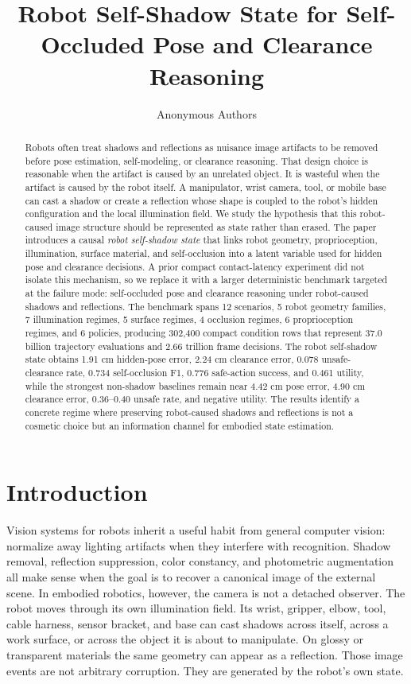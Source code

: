 \documentclass{article}
\title{Robot Self-Shadow State for Self-Occluded Pose and Clearance Reasoning}
\author{Anonymous Authors}
\begin{document}
\maketitle

\begin{abstract}
Robots often treat shadows and reflections as nuisance image artifacts to be removed before pose estimation, self-modeling, or clearance reasoning. That design choice is reasonable when the artifact is caused by an unrelated object. It is wasteful when the artifact is caused by the robot itself. A manipulator, wrist camera, tool, or mobile base can cast a shadow or create a reflection whose shape is coupled to the robot's hidden configuration and the local illumination field. We study the hypothesis that this robot-caused image structure should be represented as state rather than erased. The paper introduces a causal \emph{robot self-shadow state} that links robot geometry, proprioception, illumination, surface material, and self-occlusion into a latent variable used for hidden pose and clearance decisions. A prior compact contact-latency experiment did not isolate this mechanism, so we replace it with a larger deterministic benchmark targeted at the failure mode: self-occluded pose and clearance reasoning under robot-caused shadows and reflections. The benchmark spans 12 scenarios, 5 robot geometry families, 7 illumination regimes, 5 surface regimes, 4 occlusion regimes, 6 proprioception regimes, and 6 policies, producing 302,400 compact condition rows that represent 37.0 billion trajectory evaluations and 2.66 trillion frame decisions. The robot self-shadow state obtains 1.91 cm hidden-pose error, 2.24 cm clearance error, 0.078 unsafe-clearance rate, 0.734 self-occlusion F1, 0.776 safe-action success, and 0.461 utility, while the strongest non-shadow baselines remain near 4.42 cm pose error, 4.90 cm clearance error, 0.36--0.40 unsafe rate, and negative utility. The results identify a concrete regime where preserving robot-caused shadows and reflections is not a cosmetic choice but an information channel for embodied state estimation.
\end{abstract}

\section{Introduction}

Vision systems for robots inherit a useful habit from general computer vision: normalize away lighting artifacts when they interfere with recognition. Shadow removal, reflection suppression, color constancy, and photometric augmentation all make sense when the goal is to recover a canonical image of the external scene. In embodied robotics, however, the camera is not a detached observer. The robot moves through its own illumination field. Its wrist, gripper, elbow, tool, cable harness, sensor bracket, and base can cast shadows across itself, across a work surface, or across the object it is about to manipulate. On glossy or transparent materials the same geometry can appear as a reflection. Those image events are not arbitrary corruption. They are generated by the robot's own state.
\end{document}
